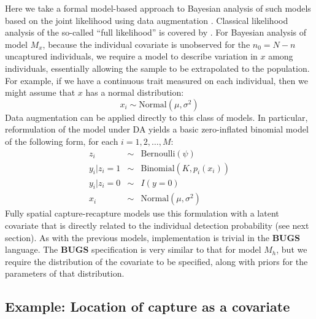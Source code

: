 Here we take a formal model-based approach to Bayesian analysis of
such models based on the joint likelihood using data augmentation
\citep{royle:2009}. Classical likelihood analysis of the so-called
``full likelihood'' is covered by \citet{borchers_etal:2002}.  For
Bayesian analysis of model $M_{x}$, because the 
individual covariate is unobserved for the $n_{0} = N-n$ uncaptured
individuals, we require a model to describe variation in $x$ among
individuals, essentially allowing the sample to be extrapolated to the
population.  For example, if we have a continuous trait measured on
each individual, then we might assume that $x$ has a normal distribution:
\[
x_{i} \sim \mbox{Normal}(\mu,\sigma^{2})
\]
Data augmentation can be applied directly to this class of models. In
particular, reformulation of the model under DA yields a basic
zero-inflated binomial model of the following form, for each
$i=1,2,\ldots, M$:
\begin{eqnarray*}
z_{i} &\sim& \mbox{Bernoulli}(\psi)  \\
y_{i}|{z_{i}\! =\! 1} &\sim& \mbox{Binomial}(K,p_{i}(x_{i})) \\
y_{i} |{ z_{i}\! =\! 0} &\sim& I(y=0)  \\
x_{i} & \sim & \mbox{Normal}(\mu,\sigma^{2})
\end{eqnarray*}
Fully spatial capture-recapture models use this formulation with a
latent covariate that is directly related to the individual detection
probability (see next section). As with the previous models,
implementation is trivial in the {\bf BUGS} language. The {\bf BUGS}
specification is very similar to that for model $M_h$, but we require
the distribution of the covariate to be specified, along with priors
for the parameters of that distribution.


\subsection{Example: Location of capture as a covariate}

